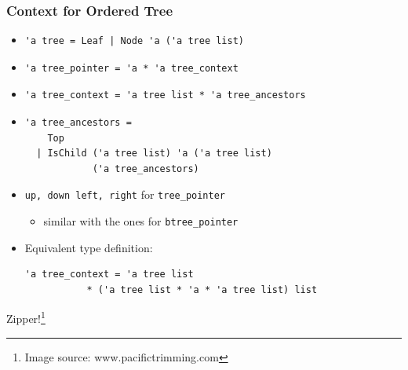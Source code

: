 \begin{frame}
\frametitle{Context for Ordered Tree}

\begin{itemize}
\item
\begin{lstlisting}
'a tree = Leaf | Node 'a ('a tree list)
\end{lstlisting}

\item
\begin{lstlisting}
'a tree_pointer = 'a * 'a tree_context
\end{lstlisting}

\item 
\begin{lstlisting}
'a tree_context = 'a tree list * 'a tree_ancestors
\end{lstlisting}

\item 
\begin{lstlisting}
'a tree_ancestors =
    Top
  | IsChild ('a tree list) 'a ('a tree list)
            ('a tree_ancestors)
\end{lstlisting}

\item \lstinline|up, down left, right| for \lstinline|tree_pointer|
\begin{itemize}
\item  similar with the ones for \lstinline|btree_pointer|
\end{itemize}

\item 
Equivalent type definition:\\
\begin{lstlisting}
'a tree_context = 'a tree list
           * ('a tree list * 'a * 'a tree list) list
\end{lstlisting}
\end{itemize}

\framebreak

Zipper!\footnote[frame]{Image source: www.pacifictrimming.com}


\end{frame}
